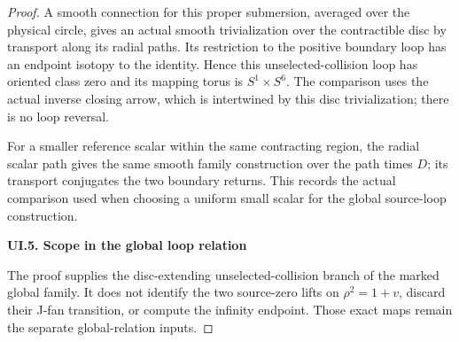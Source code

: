\begin{proof}
A smooth connection for this proper submersion, averaged over
the physical circle, gives an actual smooth trivialization
over the contractible disc by transport along its radial paths.
Its restriction to the positive boundary loop has an endpoint
isotopy to the identity. Hence this unselected-collision loop
has oriented class zero and its mapping torus is
\(S^1\times S^6\). The comparison uses the actual inverse
closing arrow, which is intertwined by this disc trivialization;
there is no loop reversal.

For a smaller reference scalar within the same contracting
region, the radial scalar path gives the same smooth family
construction over the path times \(D\); its transport conjugates
the two boundary returns. This records the actual comparison
used when choosing a uniform small scalar for the global
source-loop construction.

\par

\medskip\noindent\textbf{UI.5. Scope in the global loop relation}

\par\nobreak

The proof supplies the disc-extending unselected-collision
branch of the marked global family. It does not identify the
two source-zero lifts on \(\rho^2=1+v\), discard their J-fan
transition, or compute the infinity endpoint. Those exact
maps remain the separate global-relation inputs.

\end{proof}
